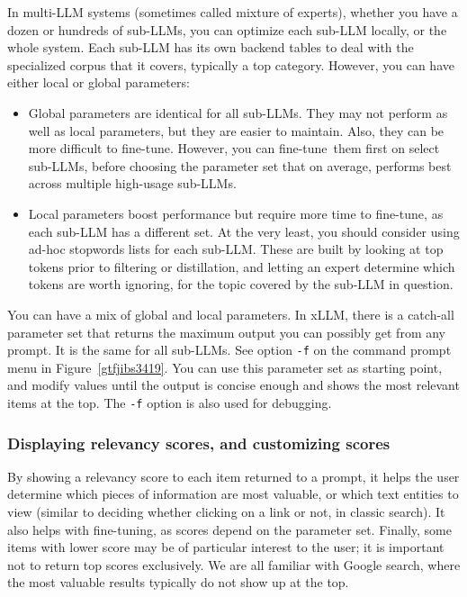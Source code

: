\documentclass[10pt]{article}
\begin{document}
{In multi-LLM systems (sometimes called \textcolor{index}{mixture of experts}), whether you have a dozen or hundreds of sub-LLMs, you can optimize each sub-LLM locally, or the whole system. Each sub-LLM has its own backend tables to deal with the specialized corpus that it covers, typically a top category. However, you can have either local or global parameters:
\vspace{1ex}
\begin{itemize}
\item Global parameters are identical for all sub-LLMs. They may not perform as well as local parameters, but they are easier to maintain. Also, they can be more difficult to fine-tune. However, you can fine-tune~them first on select sub-LLMs, before choosing the parameter set that on average, performs best across multiple high-usage sub-LLMs.
\item Local parameters boost performance but require more time to fine-tune, as each sub-LLM has a different set. At the very least, you should consider using ad-hoc \textcolor{index}{stopwords} lists for each sub-LLM. These are built by looking at top tokens prior to filtering or distillation, and letting an expert determine which tokens are worth ignoring, for the topic covered by the sub-LLM in question.
\end{itemize}
\vspace{1ex}
You can have a mix of global and local parameters. In xLLM, there is a catch-all parameter set that returns the maximum output you can possibly get from any prompt. It is the same for all sub-LLMs. See option \texttt{-f} on the command prompt menu in Figure~\ref{gtfjibs3419}. You can use this parameter set as starting point, and modify values until the output is concise
 enough and shows the most relevant items at the top. The \texttt{-f} option is also used for 
\textcolor{index}{debugging}. 


\subsubsection{Displaying relevancy scores, and customizing scores}

By showing a \textcolor{index}{relevancy score} to each item returned to a prompt, it helps the user determine which pieces of information are
 most valuable, or which text entities to view (similar to deciding whether clicking on a link or not, in classic search). It also helps with fine-tuning, as scores depend on the parameter set. Finally, some items with lower score may be
 of particular interest to the user; it is important not to return top scores exclusively.
We are all familiar with Google search, where the most valuable results typically do not show up at the top.

}
\end{document}
